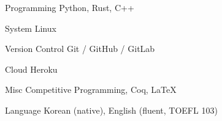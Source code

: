 

\begin{cvskills}




  \cvskill
    {Programming} %
    {Python, Rust, C++} %

  \cvskill
    {System} %
    {Linux} %

  \cvskill
    {Version Control} %
    {Git / GitHub / GitLab} %

  \cvskill
    {Cloud} %
    {Heroku} %

  \cvskill
    {Misc} %
    {Competitive Programming, Coq, LaTeX} %

  \cvskill
    {Language} %
    {Korean (native), English (fluent, TOEFL 103)} %

\end{cvskills}
